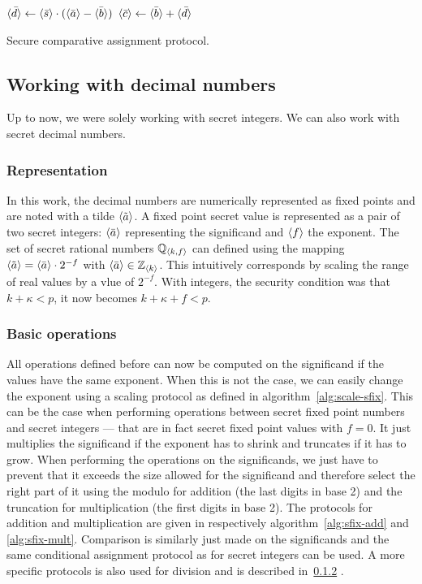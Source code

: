\begin{center}
\begin{algorithm}[H]
\DontPrintSemicolon
$\langle \bar{d} \rangle \leftarrow \langle \bar{s} \rangle \cdot (\langle \bar{a} \rangle - \langle \bar{b} \rangle)$ \;
$\langle \bar{c} \rangle \leftarrow \langle \bar{b} \rangle + \langle \bar{d} \rangle$ \;
\caption{Secure comparative assignment protocol.}
\label{alg:sec-ass}
\end{algorithm}
\end{center}

\subsection{Working with decimal numbers}
Up to now, we were solely working with secret integers. We can also work with secret decimal numbers. 

\subsubsection{Representation} 
In this work, the decimal numbers are numerically represented as fixed points and are noted with a tilde $\langle \tilde{a} \rangle$. A fixed point secret value is represented as a pair of two secret integers: $\langle \bar{a} \rangle$ representing the significand and $\langle f \rangle$ the exponent. The set of secret rational numbers $\mathbb{Q}_{\langle k,f \rangle}$ can defined using the mapping $\langle \tilde{a} \rangle = \langle \bar{a} \rangle\cdot 2^{-f}$ with $\langle \bar{a} \rangle \in \mathbb{Z}_{\langle k \rangle}$. This intuitively corresponds by scaling the range of real values by a vlue of $2^{-f}$. With integers, the security condition was that $k+\kappa < p$, it now becomes $k+\kappa+f<p$.

\subsubsection{Basic operations}
All operations defined before can now be computed on the significand if the values have the same exponent. When this is not the case, we can easily change the exponent using a scaling protocol as defined in algorithm~\ref{alg:scale-sfix}. This can be the case when performing operations between secret fixed point numbers and secret integers --- that are in fact secret fixed point values with $f=0$. It just multiplies the significand if the exponent has to shrink and truncates if it has to grow. When performing the operations on the significands, we just have to prevent that it exceeds the size allowed for the significand and therefore select the right part of it using the modulo for addition (the last digits in base 2) and the truncation for multiplication (the first digits in base 2). The protocols for addition and multiplication are given in respectively algorithm~\ref{alg:sfix-add} and \ref{alg:sfix-mult}. Comparison is similarly just made on the significands and the same conditional assignment protocol as for secret integers can be used. A more specific protocols is also used for division and is described in~\ref{} .

